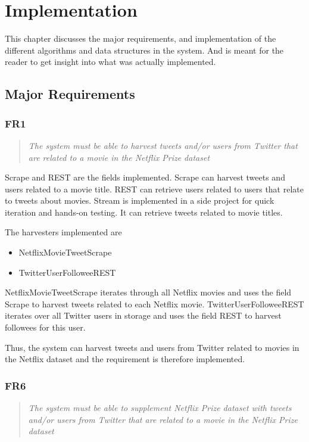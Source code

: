 
\chapter{Implementation}

\minitoc

This chapter discusses the major requirements, and implementation of the different algorithms and data structures in the system. And is meant for the reader to get insight into what was actually implemented.

\clearpage

\section{Major Requirements}\label{impl:Major Requirements}
\subsection{FR1}
\begin{quotation}
\em The system must be able to harvest tweets and/or users from Twitter that are related to a movie in the Netflix Prize dataset %
\end{quotation}

Scrape and REST are the fields implemented. Scrape can harvest tweets and users related to a movie title. REST can retrieve users related to users that relate to tweets about movies. Stream is implemented in a side project for quick iteration and hands-on testing. It can retrieve tweets related to movie titles.

The harvesters implemented are
\begin{itemize}
\item NetflixMovieTweetScrape
\item TwitterUserFolloweeREST
\end{itemize}

NetflixMovieTweetScrape iterates through all Netflix movies and uses the field Scrape to harvest tweets related to each Netflix movie. TwitterUserFolloweeREST iterates over all Twitter users in storage and uses the field REST to harvest followees for this user.

Thus, the system can harvest tweets and users from Twitter related to movies in the Netflix dataset and the requirement is therefore implemented.

\subsection{FR6}\label{subsec:FR6}
\begin{quotation}
\em The system must be able to supplement Netflix Prize dataset with tweets and/or users from Twitter that are related to a movie in the Netflix Prize dataset %
\end{quotation}

